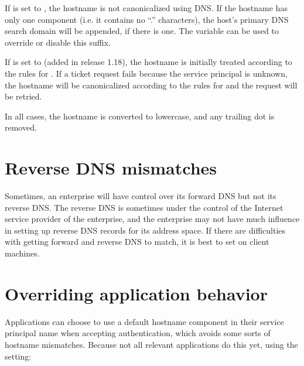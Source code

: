 \documentclass[letterpaper,10pt,english]{sphinxmanual}
\begin{document}
\sphinxAtStartPar
If  is set to , the hostname is
not canonicalized using DNS.  If the hostname has only one component
(i.e. it contains no “.” characters), the host’s primary DNS search
domain will be appended, if there is one.  The 
variable can be used to override or disable this suffix.

\sphinxAtStartPar
If  is set to  (added in
release 1.18), the hostname is initially treated according to the
rules for .  If a ticket request
fails because the service principal is unknown, the hostname will be
canonicalized according to the rules for
 and the request will be retried.

\sphinxAtStartPar
In all cases, the hostname is converted to lowercase, and any trailing
dot is removed.


\section{Reverse DNS mismatches}
\label{\detokenize{admin/princ_dns:reverse-dns-mismatches}}
\sphinxAtStartPar
Sometimes, an enterprise will have control over its forward DNS but
not its reverse DNS.  The reverse DNS is sometimes under the control
of the Internet service provider of the enterprise, and the enterprise
may not have much influence in setting up reverse DNS records for its
address space.  If there are difficulties with getting forward and
reverse DNS to match, it is best to set  on client
machines.


\section{Overriding application behavior}
\label{\detokenize{admin/princ_dns:overriding-application-behavior}}
\sphinxAtStartPar
Applications can choose to use a default hostname component in their
service principal name when accepting authentication, which avoids
some sorts of hostname mismatches.  Because not all relevant
applications do this yet, using the {\hyperref[\detokenize{admin/conf_files/krb5_conf:krb5-conf-5}]{}} setting:

\begin{sphinxVerbatim}[commandchars=\\\{\}]
\PYG{p}{[}\PYG{p}{]}
      
\end{sphinxVerbatim}
\end{document}
